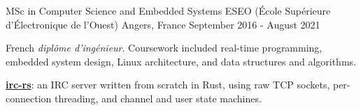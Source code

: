 

\begin{cventries}

  \cventry
    {MSc in Computer Science and Embedded Systems} %
    {ESEO (École Supérieure d'Électronique de l'Ouest)} %
    {Angers, France} %
    {September 2016 - August 2021} %
    {
      \begin{cvitems} %
        \item {French \emph{diplôme d'ingénieur}. Coursework included real-time programming, embedded system design, Linux architecture, and data structures and algorithms.}
        \item {\href{https://github.com/gondyb/irc-rs}{\textbf{irc-rs}}: an IRC server written from scratch in Rust, using raw TCP sockets, per-connection threading, and channel and user state machines.}
      \end{cvitems}
    }

\end{cventries}
